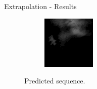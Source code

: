 \documentclass{beamer}
\begin{document}
\begin{frame}{Extrapolation - Results}
\begin{figure}
\begin{subfigure}{.3\textwidth}
	    \end{subfigure}
	    \begin{subfigure}{.3\textwidth}
	        \centering
	        \includegraphics[width=\linewidth]{fig/extra/out_2.png}
	    \end{subfigure}
	    \caption{Predicted sequence.}
	\end{figure}


\end{frame}
\end{document}
